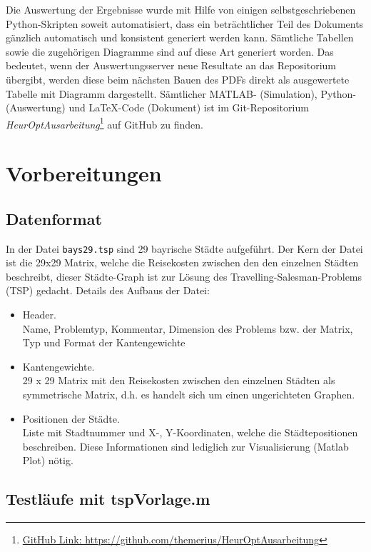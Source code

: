 Die Auswertung der Ergebnisse wurde mit Hilfe von einigen selbstgeschriebenen
Python-Skripten soweit automatisiert, dass ein beträchtlicher Teil des
Dokuments gänzlich automatisch und konsistent generiert werden kann.
Sämtliche Tabellen sowie die zugehörigen Diagramme sind auf diese Art
generiert worden.
Das bedeutet, wenn der Auswertungsserver neue Resultate an das
Repositorium übergibt, werden diese beim nächsten Bauen des PDFs
direkt als ausgewertete Tabelle mit Diagramm dargestellt.
Sämtlicher MATLAB- (Simulation), Python- (Auswertung) und LaTeX-Code (Dokument)
ist im Git-Repositorium \emph{HeurOptAusarbeitung}\footnote{
\url{GitHub Link: https://github.com/themerius/HeurOptAusarbeitung}} auf GitHub
zu finden. 


\section{Vorbereitungen}


\subsection{Datenformat}

\noindent In der Datei {\tt bays29.tsp} sind 29 bayrische Städte aufgeführt.
Der Kern der Datei ist die 29x29 Matrix, welche die Reisekosten zwischen
den den einzelnen Städten beschreibt, dieser Städte-Graph ist zur Lösung
des Travelling-Salesman-Problems (TSP) gedacht.
Details des Aufbaus der Datei:

\begin{itemize}
  \item Header.\\
  Name, Problemtyp, Kommentar, Dimension des Problems bzw. der Matrix, Typ und Format der Kantengewichte
  \item Kantengewichte.\\
  29 x 29 Matrix mit den Reisekosten zwischen den einzelnen Städten als symmetrische Matrix, d.h. es handelt sich um einen ungerichteten Graphen.
  \item Positionen der Städte.\\
  Liste mit Stadtnummer und X-, Y-Koordinaten, welche die Städtepositionen beschreiben.
  Diese Informationen sind lediglich zur Visualisierung (Matlab Plot) nötig.
\end{itemize}


\subsection{Testläufe mit tspVorlage.m}

